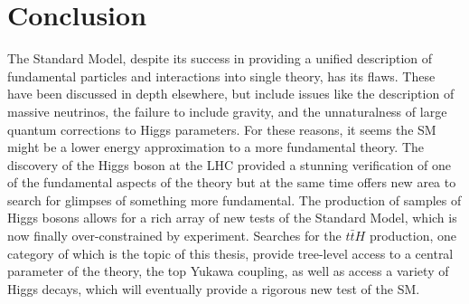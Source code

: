 \section{Conclusion}

The Standard Model, despite its success in providing a unified description of fundamental
particles and interactions into single theory, has its flaws. These have been discussed in 
depth elsewhere, but include issues like the description of massive neutrinos, the failure
to include gravity, and the unnaturalness of large quantum corrections to Higgs parameters.
For these reasons, it seems the SM might be a lower energy approximation to a more fundamental
theory. The discovery of the Higgs boson at the LHC provided a stunning verification of one
of the fundamental aspects of the theory but at the same time offers new area to search for
glimpses of something more fundamental. The production of samples of Higgs bosons
allows for a rich array of new tests of the Standard Model, which is now finally over-constrained by experiment. 
Searches for the $t\bar{t}H$ production, one category of which is the topic
of this thesis, provide tree-level access to a central parameter of the theory, the top Yukawa coupling,
as well as access a variety of Higgs decays, which will eventually provide a rigorous new 
test of the SM. 


